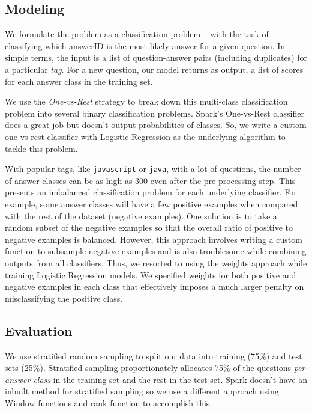 \documentclass{article}
\begin{document}
\subsection{Modeling}
We formulate the problem as a classification problem -- with the task of classifying which answerID is the most likely answer for a given question. In simple terms, the input is a list of question-answer pairs (including duplicates) for a particular \textit{tag}. For a new question, our model returns as output, a list of scores for each answer class in the training set.

We use the \textit{One-vs-Rest} strategy to break down this multi-class classification problem into several binary classification problems. Spark's One-vs-Rest classifier does a great job but doesn't output probabilities of classes. So, we write a custom one-vs-rest classifier with Logistic Regression as the underlying algorithm to tackle this problem.

With popular tags, like \texttt{javascript} or \texttt{java}, with a lot of questions, the number of answer classes can be as high as 300 even after the pre-processing step. This presents an imbalanced classification problem for each underlying classifier. For example, some answer classes will have a few positive examples when compared with the rest of the dataset (negative examples). One solution is to take a random subset of the negative examples so that the overall ratio of positive to negative examples is balanced. However, this approach involves writing a custom function to subsample negative examples and is also troublesome while combining outputs from all classifiers. Thus, we resorted to using the weights approach while training Logistic Regression models. We specified weights for both positive and negative examples in each class that effectively imposes a much larger penalty on misclassifying the positive class.

\subsection{Evaluation}
We use stratified random sampling to split our data into training (75\%) and test sets (25\%). Stratified sampling proportionately allocates 75\% of the questions \textit{per answer class} in the training set and the rest in the test set. Spark doesn't have an inbuilt method for stratified sampling so we use a different approach using Window functions and rank function to accomplish this.\\
\end{document}
